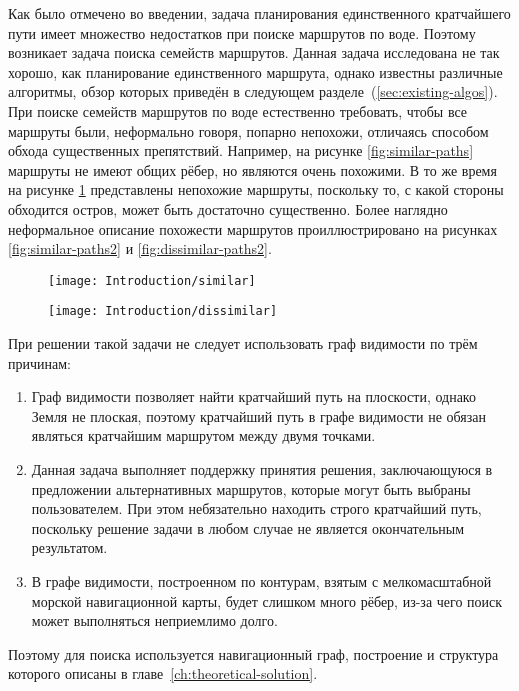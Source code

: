 Как было отмечено во введении, задача планирования единственного
кратчайшего пути имеет множество недостатков при поиске маршрутов по
воде. Поэтому возникает задача поиска семейств маршрутов. Данная
задача исследована не так хорошо, как планирование единственного
маршрута, однако известны различные алгоритмы, обзор которых приведён
в следующем разделе~(\ref{sec:existing-algos}). При поиске семейств
маршрутов по воде естественно требовать, чтобы все маршруты были,
неформально говоря, попарно непохожи, отличаясь способом обхода
существенных препятствий. Например, на рисунке \ref{fig:similar-paths}
маршруты не имеют общих рёбер, но являются очень похожими. В то же
время на рисунке \ref{fig:dissimilar-paths} представлены непохожие
маршруты, поскольку то, с какой стороны обходится остров, может быть
достаточно существенно. Более наглядно неформальное описание похожести
маршрутов проиллюстрировано на рисунках \ref{fig:similar-paths2} и
\ref {fig:dissimilar-paths2}.

\begin{figure}
    \centering
    \begin{minipage}{.5\textwidth}
        \centering
        \texttt{[image: Introduction/similar]}
        \label{fig:similar-paths}
    \end{minipage}%
    \begin{minipage}{.5\textwidth}
        \centering
        \texttt{[image: Introduction/dissimilar]}
        \label{fig:dissimilar-paths}
    \end{minipage}
\end{figure}

При решении такой задачи не следует использовать граф видимости по
трём причинам:
\begin{enumerate}
    \item Граф видимости позволяет найти кратчайший путь на плоскости,
      однако Земля не плоская, поэтому кратчайший путь в графе
      видимости не обязан являться кратчайшим маршрутом между двумя точками.
    \item Данная задача выполняет поддержку принятия решения,
      заключающуюся в предложении альтернативных маршрутов, которые
      могут быть выбраны пользователем. При этом небязательно находить
      строго кратчайший путь, поскольку решение задачи в любом случае
      не является окончательным результатом.
    \item В графе видимости, построенном по контурам, взятым с
      мелкомасштабной морской навигационной карты, будет слишком много
      рёбер, из-за чего поиск может выполняться неприемлимо долго.
\end{enumerate}
Поэтому для поиска используется навигационный граф, построение и
структура которого описаны в главе~\ref{ch:theoretical-solution}.

